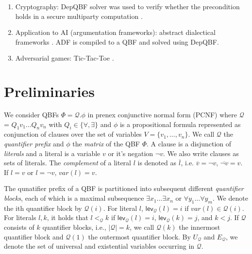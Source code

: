 \documentclass[runningheads]{llncs}
\newcommand{\var}{\mathit{var}}
\newcommand{\matrixf}{\phi}
\newcommand{\qp}{\mathcal{Q}}
\newcommand{\FFF}{\Phi}
\newcommand{\0}{0}
\newcommand{\1}{1}
\def\universals{U_\mathcal{Q}}
\def\existentials{E_\mathcal{Q}}
\def\qlvl{\mathsf{lev_\qp}}
\begin{document}
\begin{enumerate}
    \item Cryptography: DepQBF solver was used to verify whether the precondition holds in a secure multiparty computation \cite{Launchbury2014application}. 
	\item Application to AI (argumentation frameworks): abstract dialectical frameworks \cite{Brewka2020solving, Diller2014reasoning}. ADF is compiled to a QBF and solved using DepQBF.
	\item Adversarial games: Tic-Tac-Toe \cite{DiptaramaYS16}.
\end{enumerate}

\section{Preliminaries}
\label{sec:pre}

We consider QBFs $\FFF = {\qp}.\matrixf$ in prenex conjunctive normal form (PCNF) where $\qp$ = $Q_{1} v_{1} \ldots Q_{n} v_{n}$ with $Q_{i} \in \{\forall, \exists \}$ and $\matrixf$ is a propositional formula represented as conjunction of clauses over the set of variables $V = \{v_{1}, \ldots, v_{n}\}$. We call $\qp$ the \textit{quantifier prefix} and $\matrixf$ the \textit{matrix} of the QBF $\Phi$. A clause is a disjunction of \textit{literals} and a literal is a variable $v$ or it's negation $\neg v$. We also write clauses as sets of literals. The \textit{complement} of a literal $l$ is denoted as $\overline{l}$, i.e. $\overline{v} = \neg v$, $\overline{\neg{v}} = v$. If $l = v$ or $l = \neg v$, $\var(l) = v$.

The qunatifier prefix of a QBF is partitioned into subsequent different \textit{quantifier blocks}, each of which is a maximal subsequence $\exists x_{1} \ldots \exists x_{n}$ or $\forall y_{1} \ldots \forall y_{m}$. We denote the ith quantifier block by $\qp(i)$. For literal $l$, $\qlvl(l) = i$ if $\var(l) \in \qp(i)$. For literals $l, k$, it holds that $l <_\qp k$ if $\qlvl(l) = i$, $\qlvl(k) = j$, and $k < j$. If $\qp$ consists of $k$ quantifier blocks, i.e., $|\qp| = k$,  we call $\qp({k})$ the innermost quantifier block and $\qp({1})$ the outermost quantifier block. By $\universals$ and $\existentials$, we denote the set of universal and existential variables occurring in $\qp$. 
\end{document}
